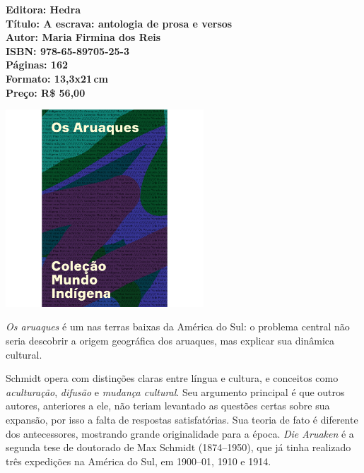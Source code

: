 \vfill
\noindent\begin{minipage}[c]{1\linewidth}
{\small\textbf{
\hspace*{-.1cm}Editora: Hedra\\
Título: A escrava: antologia de prosa e versos\\
Autor: Maria Firmina dos Reis\\ 
ISBN: 978-65-89705-25-3\\
Páginas: 162\\
Formato: 13,3x21\,cm\\
Preço: R\$ 56,00\\
}}
\end{minipage}
\pagebreak

\begin{center}
\hspace*{-3.6cm}
\hspace*{3.1cm}\includegraphics[width=74mm]{./CAPAS/HEDRA_ARUAQUES.jpg}
\end{center}
\hspace*{-7cm}\hrulefill\hspace*{-7cm}
\medskip

\noindent{}\textit{Os aruaques} é um  nas terras baixas da América do Sul: o problema central não seria descobrir a origem geográfica dos aruaques, mas explicar sua dinâmica cultural. 

Schmidt opera com distinções claras entre língua e cultura, e conceitos como \textit{aculturação}, \textit{difusão} e \textit{mudança cultural}. Seu argumento principal é que outros autores, anteriores a ele, não teriam levantado as questões certas sobre sua expansão, por isso a falta de respostas satisfatórias. Sua teoria de fato é diferente dos antecessores, mostrando grande originalidade para a época. \textit{Die Aruaken} é a segunda tese de doutorado de Max Schmidt (1874--1950), que já tinha realizado três expedições na América do Sul, em 1900--01, 1910 e 1914.

